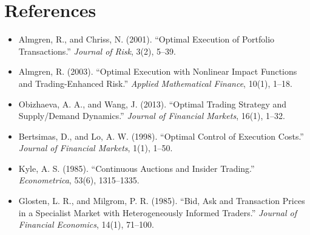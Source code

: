 \documentclass[11pt]{article}
\theoremstyle{remark}
\theoremstyle{definition}
\begin{document}
\section*{References}
\begin{itemize}
\item Almgren, R., and Chriss, N. (2001). ``Optimal Execution of Portfolio Transactions.'' \textit{Journal of Risk}, 3(2), 5--39.
\item Almgren, R. (2003). ``Optimal Execution with Nonlinear Impact Functions and Trading-Enhanced Risk.'' \textit{Applied Mathematical Finance}, 10(1), 1--18.
\item Obizhaeva, A. A., and Wang, J. (2013). ``Optimal Trading Strategy and Supply/Demand Dynamics.'' \textit{Journal of Financial Markets}, 16(1), 1--32.
\item Bertsimas, D., and Lo, A. W. (1998). ``Optimal Control of Execution Costs.'' \textit{Journal of Financial Markets}, 1(1), 1--50.
\item Kyle, A. S. (1985). ``Continuous Auctions and Insider Trading.'' \textit{Econometrica}, 53(6), 1315--1335.
\item Glosten, L. R., and Milgrom, P. R. (1985). ``Bid, Ask and Transaction Prices in a Specialist Market with Heterogeneously Informed Traders.'' \textit{Journal of Financial Economics}, 14(1), 71--100.
\end{itemize}
\end{document}

